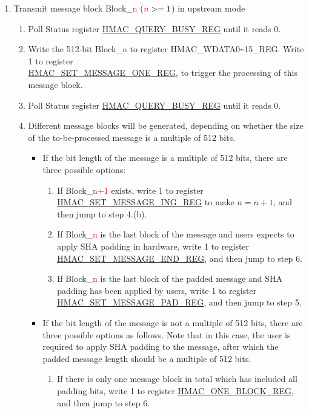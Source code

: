 \documentclass[main\_\_EN.tex]{subfiles}
\begin{document}
\begin{enumerate}
    \item Transmit message block Block\_\textcolor{red}{n} ($\textcolor{red}{n}>=1$) in upstream mode
    \begin{enumerate}
        \item Poll Status register \hyperref[regdesc:HMACQUERYBUSYREG]{HMAC\_QUERY\_BUSY\_REG} until it reads 0.
        \item Write the 512-bit Block\_\textcolor{red}{n} to register HMAC\_WDATA0\verb+~+15\_REG. Write 1 to register\\ \hyperref[regdesc:HMACSETMESSAGEONEREG]{HMAC\_SET\_MESSAGE\_ONE\_REG}, to trigger the processing of this message block.
        \item Poll Status register \hyperref[regdesc:HMACQUERYBUSYREG]{HMAC\_QUERY\_BUSY\_REG} until it reads 0.
        \item Different message blocks will be generated, depending on whether the size of the to-be-processed message is a multiple of 512 bits.
        \begin{itemize}
            \item If the bit length of the message is a multiple of 512 bits, there are three possible options:
            \begin{enumerate}
                \item If Block\_\textcolor{red}{n+1} exists, write 1 to register \hyperref[regdesc:HMACSETMESSAGEINGREG]{HMAC\_SET\_MESSAGE\_ING\_REG} to make $n=n+1$, and then jump to step 4.(b).
                \item If Block\_\textcolor{red}{n} is the last block of the message and users expects to apply SHA padding in hardware, write 1 to register \hyperref[regdesc:HMACSETMESSAGEENDREG]{HMAC\_SET\_MESSAGE\_END\_REG}, and then jump to step 6.
                \item If Block\_\textcolor{red}{n} is the last block of the padded message and SHA padding has been applied by users, write 1 to register \hyperref[regdesc:HMACSETMESSAGEPADREG]{HMAC\_SET\_MESSAGE\_PAD\_REG}, and then jump to step 5.
            \end{enumerate}
            \item If the bit length of the message is not a multiple of 512 bits, there are three possible options as follows. Note that in this case, the user is required to apply SHA padding to the message, after which the padded message length should be a multiple of 512 bits.
            \begin{enumerate}
                \item If there is only one message block in total which has included all padding bits, write 1 to register \hyperref[regdesc:HMACONEBLOCKREG]{HMAC\_ONE\_BLOCK\_REG}, and then jump to step 6.

\end{enumerate}
\end{itemize}
\end{enumerate}
\end{enumerate}
\end{document}
